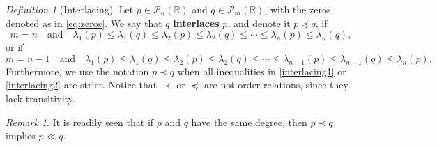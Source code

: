 \documentclass[reqno,11pt]{amsart}
\theoremstyle{remark}
\newtheorem{remark}[theorem]{Remark}
\newtheorem{definition}[theorem]{Definition}
\newcommand{\R}{\mathbb{R}}
\newcommand{\pol}{\mathcal{P}}
\begin{document}
\begin{definition}[Interlacing] 
Let $p\in \pol_n(\R)$ and $q\in \pol_m(\R)$, with the zeros denoted as in \eqref{eq:zeros}.  
We say that $q$ \textbf{interlaces} $p$, and denote it $p \preccurlyeq q$, if 
\begin{equation} \label{interlacing1}
    m=n \quad \text{and} \quad \lambda_1(p) \leq \lambda_1(q) \leq \lambda_2(p) \leq \lambda_2(q) \leq \cdots \leq  \lambda_n(p) \leq \lambda_n(q),
\end{equation}
or if
\begin{equation} \label{interlacing2}
    m=n-1 \quad \text{and} \quad \lambda_1(p) \leq \lambda_1(q) \leq \lambda_2(p) \leq \lambda_2(q) \leq \cdots \leq  \lambda_{n-1}(p) \leq \lambda_{n-1}(q) \le \lambda_n(p).
\end{equation}
Furthermore, we use the notation $p \prec q$ when all inequalities in \eqref{interlacing1} or \eqref{interlacing2} are strict. Notice that $\prec$ or $\preccurlyeq$ are not order relations, since they lack transitivity.
\end{definition}

\begin{remark}
\label{rem:implication.orders}
It is readily seen that if $p$ and $q$ have the same degree, then $p\prec q$ implies $p \ll q$. 
\end{remark}
\end{document}
